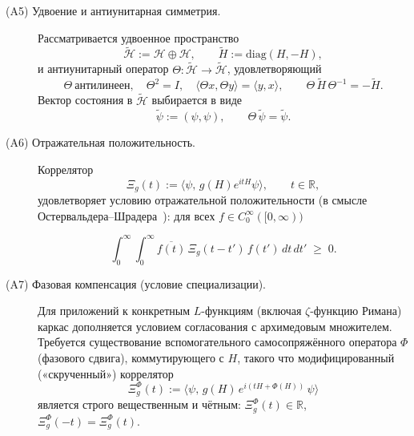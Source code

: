 \documentclass{article}
\numberwithin{equation}{section}
\theoremstyle{plain}
\theoremstyle{definition}
\theoremstyle{remark}
\def\infty{∞}\def\partial{∂}\def\sum{Σ}\def\int{∫}%
\begin{document}
\begin{description}
  \item[(A5) Удвоение и антиунитарная симметрия.]
  Рассматривается удвоенное пространство
  \begin{equation}
  \label{eq:qssc-double-space}
  \widetilde{\mathcal H}
  := \mathcal H\oplus\mathcal H,
  \qquad
  \widetilde H := \mathrm{diag}(H,-H),
  \end{equation}
  и антиунитарный оператор $\Theta:\widetilde{\mathcal H}\to\widetilde{\mathcal H}$,
  удовлетворяющий
  \begin{equation}
  \label{eq:qssc-theta}
  \Theta\ \text{антилинеен},\quad
  \Theta^2 = I,\quad
  \langle \Theta x,\Theta y\rangle = \langle y,x\rangle,
  \qquad
  \Theta\,\widetilde H\,\Theta^{-1} = -\widetilde H.
  \end{equation}
  Вектор состояния в $\widetilde{\mathcal H}$ выбирается в виде
  \begin{equation}
  \label{eq:qssc-psi-tilde}
  \widetilde\psi := (\psi,\psi),
  \qquad
  \Theta\,\widetilde\psi = \widetilde\psi.
  \end{equation}

  \item[(A6) Отражательная положительность.]
  Коррелятор
  \begin{equation}
  \label{eq:qssc-correlator}
  \Xi_g(t)
  :=
  \langle\psi,\,g(H)e^{itH}\psi\rangle,
  \qquad t\in\mathbb R,
  \end{equation}
  удовлетворяет условию отражательной положительности
  (в смысле Остервальдера–Шрадера~\cite{OsterwalderSchrader1973}): для всех
  $f\in C_0^\infty([0,\infty))$

\begin{equation}
  \label{eq:qssc-reflection-positivity}
  \int_0^\infty\!\!\int_0^\infty
  \overline{f(t)}\,\Xi_g(t-t')\,f(t')\,dt\,dt'
  \;\ge\;0.
  \end{equation}

  \item[(A7) Фазовая компенсация (условие специализации).]
  Для приложений к конкретным $L$-функциям (включая $\zeta$-функцию Римана) каркас дополняется условием согласования с архимедовым множителем. Требуется существование вспомогательного самосопряжённого оператора $\Phi$ (фазового сдвига), коммутирующего с $H$, такого что модифицированный («скрученный») коррелятор
  \begin{equation}
  \label{eq:qssc-A7}
  \Xi_g^{\Phi}(t) := \big\langle \psi,\, g(H)\, e^{i(tH + \Phi(H))}\, \psi \big\rangle
  \end{equation}
  является строго вещественным и чётным: $\Xi_g^{\Phi}(t) \in \mathbb{R}$, $\Xi_g^{\Phi}(-t) = \Xi_g^{\Phi}(t)$.
\end{description}
\end{document}
